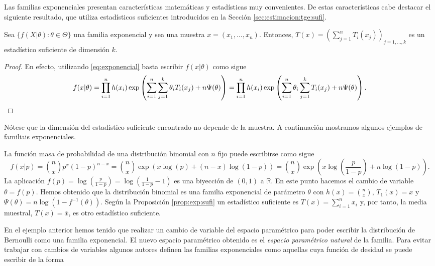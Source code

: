 \documentclass{article}
\begin{document}
    Las familias exponenciales presentan características matemáticas y estadísticas muy convenientes. De estas características cabe destacar el siguiente resultado, que utiliza estadísticos suficientes introducidos en la Sección \ref{sec:estimacion:tge:sufi}.

    \begin{prop} \label{prop:exp:sufi}
        Sea $\{f(X | \theta): \theta \in \Theta\}$ una familia exponencial y sea una muestra $x = (x_1, \ldots, x_n)$. Entonces, $T(x) = (\sum_{j = 1}^n T_i(x_j))_{j = 1, \ldots, k}$ es un estadístico suficiente de dimensión $k$.
    \end{prop}
    \begin{proof}
        En efecto, utilizando \eqref{eq:exponencial} basta escribir $f(x | \theta)$ como sigue
        \begin{equation*}
            f(x | \theta) = \prod_{i=1}^n h(x_i) \exp\left(\sum^n_{i=1}\sum^k_{j=1} \theta_i T_i(x_j)  + n\Psi(\theta)\right) = \prod_{i=1}^{n}h(x_i) \exp\left(\sum_{i=1}^{n}\theta_i \sum^k_{j=1} T_i(x_j)  + n\Psi(\theta)\right). \qedhere
        \end{equation*}
    \end{proof}

    Nótese que la dimensión del estadístico suficiente encontrado no depende de la muestra. A continuación mostramos algunos ejemplos de familiais exponenciales.

    \begin{ex} \label{ex:exp:binom}
        La función masa de probabilidad de una distribución binomial con $n$ fijo puede escribirse como sigue
        \[f(x|p) = \binom{n}{x} p^x (1-p)^{n-x} = \binom{n}{x} \exp(x\log(p) + (n-x) \log(1-p)) = \binom{n}{x} \exp(x\log(\frac{p}{1-p}) + n \log(1-p)). \]
        La aplicación  $f(p) = \log(\frac{p}{1-p}) = \log(\frac{1}{1-p} - 1)$ es una biyección de $(0,1)$ a $\mathbb{R}$. En este punto hacemos el cambio de variable $\theta = f(p)$.
        Hemos obtenido que la distribución binomial es una familia exponencial de parámetro $\theta$ con $h(x) = \binom{n}{x}$, $T_1(x) = x$ y $\Psi(\theta) = n \log(1 - f^{-1}(\theta))$. Según la Proposición \ref{prop:exp:sufi} un estadístico suficiente es $T(x) = \sum_{i = 1}^n x_i$ y, por tanto, la media muestral, $T(x) = \overline{x}$, es otro estadístico suficiente.
    \end{ex}

    En el ejemplo anterior hemos tenido que realizar un cambio de variable del espacio paramétrico para poder escribir la distribución de Bernoulli como una familia exponencial. El nuevo espacio paramétrico obtenido es el \emph{espacio paramétrico natural} de la familia. Para evitar trabajar con cambios de variables algunos autores definen las familias exponenciales como aquellas cuya función de desidad se puede escribir de la forma
\end{document}

